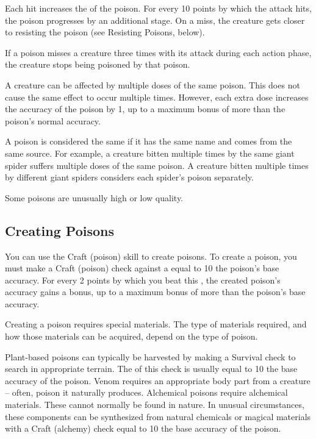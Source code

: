         Each hit increases the  of the poison.
        For every 10 points by which the attack hits, the poison progresses by an additional stage.
        On a miss, the creature gets closer to resisting the poison (see Resisting Poisons, below).

        If a poison misses a creature three times with its attack during each action phase, the creature stops being poisoned by that poison.

        A creature can be affected by multiple doses of the same poison.
        This does not cause the same effect to occur multiple times.
        However, each extra dose increases the accuracy of the poison by 1, up to a maximum bonus of  more than the poison's normal accuracy.

        A poison is considered the same if it has the same name and comes from the same source.
        For example, a creature bitten multiple times by the same giant spider suffers multiple doses of the same poison.
        A creature bitten multiple times by different giant spiders considers each spider's poison separately.

         Some poisons are unusually high or low quality.

    \subsection{Creating Poisons}\label{Creating Poisons}

        You can use the Craft (poison) skill to create poisons.
        To create a poison, you must make a Craft (poison) check against a  equal to 10 \add the poison's base accuracy.
        For every 2 points by which you beat this , the created poison's accuracy gains a  bonus, up to a maximum bonus of  more than the poison's base accuracy.

        Creating a poison requires special materials.
        The type of materials required, and how those materials can be acquired, depend on the type of poison.

        \begin{itemize}
             Plant-based poisons can typically be harvested by making a Survival check to search in appropriate terrain.
                The  of this check is usually equal to 10 \add the base accuracy of the poison.
             Venom requires an appropriate body part from a creature -- often, poison it naturally produces.
             Alchemical poisons require alchemical materials.
                These cannot normally be found in nature.
                In unusual circumstances, these components can be synthesized from natural chemicals or magical materials with a Craft (alchemy) check equal to 10 \add the base accuracy of the poison.
        \end{itemize}

